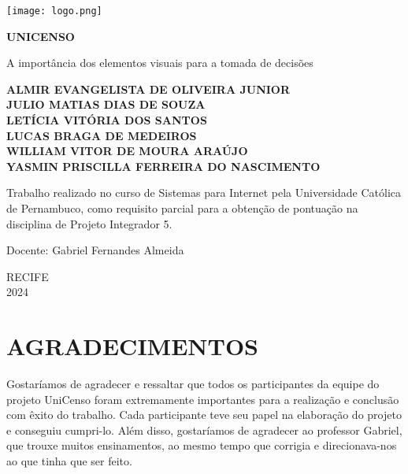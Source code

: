\documentclass[a4paper,12pt]{article}
\begin{document}
\begin{titlepage}
  \centering
  \texttt{[image: logo.png]} 
  
  \vspace*{2cm}

  \Huge
  \textbf{UNICENSO}

  \vspace{0.5cm}
  \LARGE
  A importância dos elementos visuais para a tomada de decisões

  \vspace{1.5cm}

  \small %
  \textbf{ALMIR EVANGELISTA DE OLIVEIRA JUNIOR}\\
  \textbf{JULIO MATIAS DIAS DE SOUZA}\\
  \textbf{LETÍCIA VITÓRIA DOS SANTOS}\\
  \textbf{LUCAS BRAGA DE MEDEIROS}\\
  \textbf{WILLIAM VITOR DE MOURA ARAÚJO}\\
  \textbf{YASMIN PRISCILLA FERREIRA DO NASCIMENTO}

  \vfill

  \Large
  Trabalho realizado no curso de Sistemas para Internet pela Universidade Católica de Pernambuco, como requisito parcial para a obtenção de pontuação na disciplina de Projeto Integrador 5.

  \vspace{0.8cm}
  \Large
  Docente: Gabriel Fernandes Almeida

  \vspace{0.8cm}
  \Large
  RECIFE\\
  2024
\end{titlepage}



\newpage

\section*{AGRADECIMENTOS}

Gostaríamos de agradecer e ressaltar que todos os participantes da equipe do projeto UniCenso foram extremamente importantes para a realização e conclusão com êxito do trabalho. Cada participante teve seu papel na elaboração do projeto e conseguiu cumpri-lo. Além disso, gostaríamos de agradecer ao professor Gabriel, que trouxe muitos ensinamentos, ao mesmo tempo que corrigia e direcionava-nos ao que tinha que ser feito.

\vspace{2cm}
\end{document}
